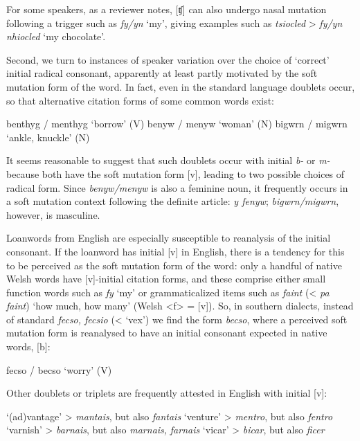 \documentclass[output=paper,colorlinks,citecolor=brown]{langscibook}
\begin{document}
{For some speakers, as a reviewer notes, [ʧ] can also undergo nasal mutation following a trigger such as} {\textit{fy/yn} }{‘my’, giving examples such as} {\textit{tsiocled} }{>} {\textit{fy/yn nhiocled} }{‘my chocolate’.} 

Second, we turn to instances of speaker variation over the choice of ‘correct’ initial radical consonant, apparently at least partly motivated by the  soft mutation form of the word. In fact, even in the standard language doublets occur, so that alternative citation forms of some common words exist:

\ea
\ea
benthyg / menthyg ‘borrow’ (V)
\ex
benyw / menyw ‘woman’ (N)
\ex
bigwrn / migwrn ‘ankle, knuckle’ (N)
\z
\z

{It seems reasonable to suggest that such doublets occur with initial} {\textit{b-}}{ or} {\textit{m-}}{ because both have the  soft mutation form [v], leading to two possible choices of radical form. Since} {\textit{benyw/menyw} }{is also a feminine noun, it frequently occurs in a soft mutation context following the definite article:} {\textit{y fenyw}}{;} {\textit{bigwrn/migwrn}}{, however, is masculine.} 

Loanwords  from English are especially susceptible to reanalysis of the initial consonant. If the loanword has initial [v] in English, there is a tendency for this to be perceived as the  soft mutation form of the word: only a handful of native Welsh words have [v]-initial citation forms, and these comprise either  small function words such as {\textit{fy}}{ ‘my’ or grammaticalized items such as} {\textit{faint}}{ (<} {\textit{pa faint}}{) ‘how much, how many’ (Welsh <f> = [v]). So, in southern dialects, instead of standard} {\textit{fecso, fecsio}}{ (< ‘vex’) we find the form} {\textit{becso}}{, where a perceived  soft mutation form is reanalysed to have an initial consonant expected in native words, [b]:} 

\ea\label{ex:mt:tallerman:36}
fecso / becso ‘worry’ (V) 
\z

\noindent Other doublets or triplets are frequently attested in English  with initial [v]: 

\ea\label{ex:mt:tallerman:37}
\ea
{  ‘(ad)vantage’ >} {\textit{mantais}}{, but also} {\textit{fantais}}
\ex
{  ‘venture’ >} {\textit{mentro}}{, but also} {\textit{fentro}}
\ex
{  ‘varnish’ >} {\textit{barnais}}{, but also} {\textit{marnais,}}{} {\textit{farnais}}
\ex
{  ‘vicar’ >} {\textit{bicar}}{, but also} {\textit{ficer}}
\z
\z
\end{document}
